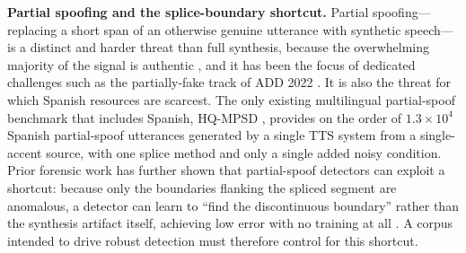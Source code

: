 \documentclass[11pt]{article}
\begin{document}
\textbf{Partial spoofing and the splice-boundary shortcut.} Partial spoofing---replacing a short span of an otherwise genuine utterance with synthetic speech---is a distinct and harder threat than full synthesis, because the overwhelming majority of the signal is authentic \citep{zhang2023partialspoof}, and it has been the focus of dedicated challenges such as the partially-fake track of ADD 2022 \citep{add2022}. It is also the threat for which Spanish resources are scarcest. The only existing multilingual partial-spoof benchmark that includes Spanish, HQ-MPSD \citep{li2025hqmpsd}, provides on the order of $1.3\times10^{4}$ Spanish partial-spoof utterances generated by a single TTS system from a single-accent source, with one splice method and only a single added noisy condition. Prior forensic work has further shown that partial-spoof detectors can exploit a shortcut: because only the boundaries flanking the spliced segment are anomalous, a detector can learn to ``find the discontinuous boundary'' rather than the synthesis artifact itself, achieving low error with no training at all \citep{negroni2024splicing,huang2024detectable}. A corpus intended to drive robust detection must therefore control for this shortcut.
\end{document}
